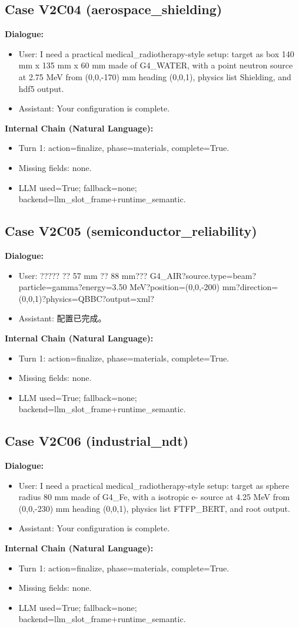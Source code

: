 \documentclass[11pt]{ctexart}
\begin{document}
\subsection{Case V2C04 (aerospace\_shielding)}
\textbf{Dialogue:}
\begin{itemize}
\item User: I need a practical medical\_radiotherapy-style setup: target as box 140 mm x 135 mm x 60 mm made of G4\_WATER, with a point neutron source at 2.75 MeV from (0,0,-170) mm heading (0,0,1), physics list Shielding, and hdf5 output.
\item Assistant: Your configuration is complete.
\end{itemize}
\textbf{Internal Chain (Natural Language):}
\begin{itemize}
\item Turn 1: action=finalize, phase=materials, complete=True.
\item Missing fields: none.
\item LLM used=True; fallback=none; backend=llm\_slot\_frame+runtime\_semantic.
\end{itemize}
\subsection{Case V2C05 (semiconductor\_reliability)}
\textbf{Dialogue:}
\begin{itemize}
\item User: ????? ?? 57 mm ?? 88 mm??? G4\_AIR?source.type=beam?particle=gamma?energy=3.50 MeV?position=(0,0,-200) mm?direction=(0,0,1)?physics=QBBC?output=xml?
\item Assistant: 配置已完成。
\end{itemize}
\textbf{Internal Chain (Natural Language):}
\begin{itemize}
\item Turn 1: action=finalize, phase=materials, complete=True.
\item Missing fields: none.
\item LLM used=True; fallback=none; backend=llm\_slot\_frame+runtime\_semantic.
\end{itemize}
\subsection{Case V2C06 (industrial\_ndt)}
\textbf{Dialogue:}
\begin{itemize}
\item User: I need a practical medical\_radiotherapy-style setup: target as sphere radius 80 mm made of G4\_Fe, with a isotropic e- source at 4.25 MeV from (0,0,-230) mm heading (0,0,1), physics list FTFP\_BERT, and root output.
\item Assistant: Your configuration is complete.
\end{itemize}
\textbf{Internal Chain (Natural Language):}
\begin{itemize}
\item Turn 1: action=finalize, phase=materials, complete=True.
\item Missing fields: none.
\item LLM used=True; fallback=none; backend=llm\_slot\_frame+runtime\_semantic.
\end{itemize}
\end{document}
